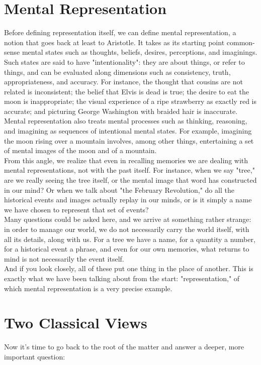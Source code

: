 \section{Mental Representation}
\label{sec:mental-representation}
Before defining representation itself, we can define mental representation, a notion that goes back at least to Aristotle. It takes as its starting point common-sense mental states such as thoughts, beliefs, desires, perceptions, and imaginings. Such states are said to have "intentionality": they are about things, or refer to things, and can be evaluated along dimensions such as consistency, truth, appropriateness, and accuracy. For instance, the thought that cousins are not related is inconsistent; the belief that Elvis is dead is true; the desire to eat the moon is inappropriate; the visual experience of a ripe strawberry as exactly red is accurate; and picturing George Washington with braided hair is inaccurate\autocite{sep-mental-representation}.
\newpage Mental representation also treats mental processes such as thinking, reasoning, and imagining as sequences of intentional mental states. For example, imagining the moon rising over a mountain involves, among other things, entertaining a set of mental images of the moon and of a mountain\autocite{sep-mental-representation}.\\
From this angle, we realize that even in recalling memories we are dealing with mental representations, not with the past itself. For instance, when we say "tree," are we really seeing the tree itself, or the mental image that word has constructed in our mind? Or when we talk about "the February Revolution," do all the historical events and images actually replay in our minds, or is it simply a name we have chosen to represent that set of events?\\
Many questions could be asked here, and we arrive at something rather strange: in order to manage our world, we do not necessarily carry the world itself, with all its details, along with us. For a tree we have a name, for a quantity a number, for a historical event a phrase, and even for our own memories, what returns to mind is not necessarily the event itself.\\
And if you look closely, all of these put one thing in the place of another. This is exactly what we have been talking about from the start: "representation," of which mental representation is a very precise example.

\newpage

\section{Two Classical Views}
\label{sec:two-classical-views}
Now it's time to go back to the root of the matter and answer a deeper, more important question:

